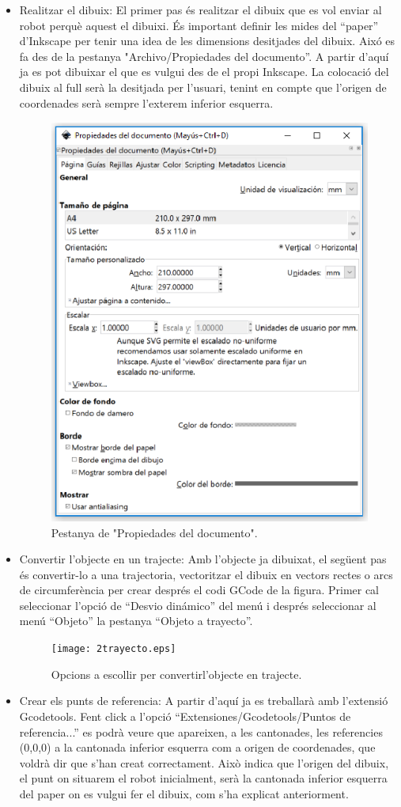 \begin{itemize}
	
	\item	Realitzar el dibuix: El primer pas és realitzar el dibuix que es vol enviar al robot perquè aquest el dibuixi. És important definir les mides del “paper” d'Inkscape per tenir una idea de les dimensions desitjades del dibuix. Aixó es fa des de la pestanya "Archivo/Propiedades del documento”. A partir d'aquí ja es pot dibuixar el que es vulgui des de el propi Inkscape. La colocació del dibuix al full serà la desitjada per l'usuari, tenint en compte que l'origen de coordenades serà sempre l'exterem inferior esquerra. 
	
	\begin{figure}[H]
		\centering
		\includegraphics[width=0.40\linewidth]{1PropDocumento.eps}
		\caption{Pestanya de "Propiedades del documento".}
		\label{fig:PropDocumento}
	\end{figure}
	
	\item Convertir l'objecte en un trajecte: Amb l'objecte ja dibuixat, el següent pas és convertir-lo a una trajectoria, vectoritzar el dibuix en vectors rectes o arcs de circumferència per crear després el codi GCode de la figura. Primer cal seleccionar l'opció de “Desvio dinámico” del menú i després seleccionar al menú “Objeto” la pestanya “Objeto a trayecto”.
	
	\begin{figure}[H]
		\centering
		\texttt{[image: 2trayecto.eps]}
		\caption{Opcions a escollir per convertirl'objecte en trajecte.}
		\label{fig:objeto a trayecto}
	\end{figure}
	
	\item Crear els punts de referencia: A partir d'aquí ja es treballarà amb l'extensió Gcodetools. Fent click a l'opció “Extensiones/Gcodetools/Puntos de referencia...” es podrà veure que apareixen, a les cantonades, les referencies (0,0,0) a la cantonada inferior esquerra com a origen de coordenades, que voldrà dir que s'han creat correctament. Això indica que l'origen del dibuix, el punt on situarem el robot inicialment, serà la cantonada inferior esquerra del paper on es vulgui fer el dibuix, com s'ha explicat anteriorment.
	

\end{itemize}
